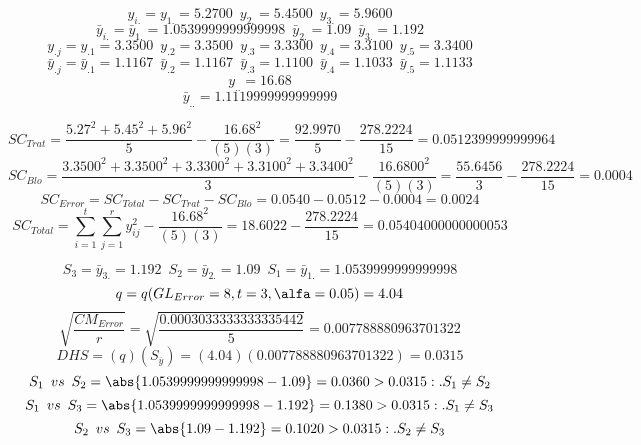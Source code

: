 





$$y_{i.}=y_{1.}=5.2700 \enspace y_{2.}=5.4500 \enspace y_{3.}=5.9600$$
$$\bar{y}_{i.}=\bar{y}_{1.}=1.0539999999999998 \enspace \bar{y}_{2.}=1.09 \enspace \bar{y}_{3.}=1.192$$
$$y_{.j}=y_{.1}=3.3500 \enspace y_{.2}=3.3500 \enspace y_{.3}=3.3300 \enspace y_{.4}=3.3100 \enspace y_{.5}=3.3400$$
$$\bar{y}_{.j}=\bar{y}_{.1}=1.1167 \enspace \bar{y}_{.2}=1.1167 \enspace \bar{y}_{.3}=1.1100 \enspace \bar{y}_{.4}=1.1033 \enspace \bar{y}_{.5}=1.1133$$
$$y_{..}=16.68$$
$$\bar{y}_{..}=1.1119999999999999$$

$$SC_{Trat}=\frac{5.27^{2}+5.45^{2}+5.96^{2}}{5}-\frac{16.68^{2}}{(5)(3)}=\frac{92.9970}{5}-\frac{278.2224}{15}=0.0512399999999964$$
$$SC_{Blo}=\frac{3.3500^{2}+3.3500^{2}+3.3300^{2}+3.3100^{2}+3.3400^{2}}{3}-\frac{16.6800^{2}}{(5)(3)}=\frac{55.6456}{3}-\frac{278.2224}{15}=0.0004$$
$$SC_{Error}=SC_{Total}-SC_{Trat}-SC_{Blo}=0.0540-0.0512-0.0004=0.0024$$
$$SC_{Total}=\sum_{i=1}^{\mathit{t}}\sum_{j=1}^{\mathit{r}}y_{ij}^{2}-\frac{16.68^{2}}{(5)(3)}=18.6022-\frac{278.2224}{15}=0.05404000000000053$$

$$S_{3}=\bar{y}_{3.}=1.192 \enspace S_{2}=\bar{y}_{2.}=1.09 \enspace S_{1}=\bar{y}_{1.}=1.0539999999999998$$
$$q=q(GL_{Error}=8, t=3, \alfa=0.05)=4.04$$
$$\sqrt{\frac{CM_{Error}}{r}}=\sqrt{\frac{0.0003033333333335442}{5}}=0.007788880963701322$$
$$DHS=(q)(S_{\bar{y}})=(4.04)(0.007788880963701322)=0.0315$$
$$S_{1} \enspace vs \enspace S_{2} = \abs{1.0539999999999998-1.09}=0.0360>0.0315:.S_{1}\not=S_{2}$$
$$S_{1} \enspace vs \enspace S_{3} = \abs{1.0539999999999998-1.192}=0.1380>0.0315:.S_{1}\not=S_{3}$$
$$S_{2} \enspace vs \enspace S_{3} = \abs{1.09-1.192}=0.1020>0.0315:.S_{2}\not=S_{3}$$


